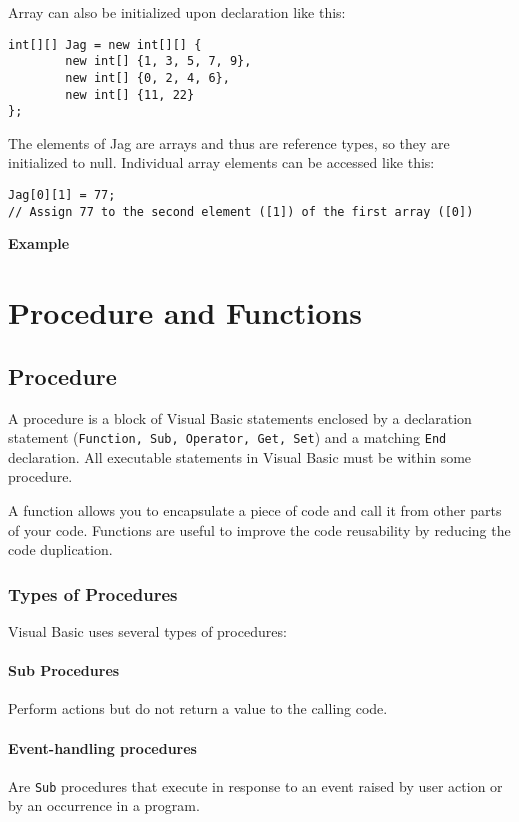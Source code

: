\noindent \break Array can also be initialized upon declaration like this:
\begin{lstlisting}[numbers=none]
int[][] Jag = new int[][] {
		new int[] {1, 3, 5, 7, 9},
		new int[] {0, 2, 4, 6},
		new int[] {11, 22}
};
\end{lstlisting}

 The elements of Jag are arrays and thus are reference types, so they are initialized to null. Individual array elements can be accessed like this:

\begin{lstlisting}[numbers=none]
Jag[0][1] = 77;
// Assign 77 to the second element ([1]) of the first array ([0])
\end{lstlisting}

\noindent \break \textbf{Example} \\



\section{Procedure and Functions}

\subsection{Procedure}
A procedure is a block of Visual Basic statements enclosed by a declaration statement (\texttt{Function, Sub, Operator, Get, Set}) and a matching \texttt{End} declaration. All executable statements in Visual Basic must be within some procedure.

A function allows you to encapsulate a piece of code and call it from other parts of your code. Functions are useful to improve the code reusability by reducing the code duplication.

\subsubsection*{Types of Procedures}
Visual Basic uses several types of procedures:

\paragraph*{Sub Procedures}
Perform actions but do not return a value to the calling code.

\paragraph*{Event-handling procedures}
Are \texttt{Sub} procedures that execute in response to an event raised by user action or by an occurrence in a program.

